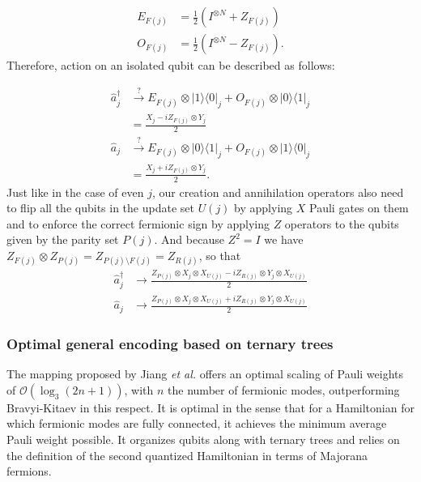 \begin{equation}
\begin{aligned}
E_{F(j)} &= \frac{1}{2}\left(I^{\otimes N} + Z_{F(j)} \right)\\
O_{F(j)} &= \frac{1}{2}\left(I^{\otimes N} - Z_{F(j)} \right).
\end{aligned}
\label{eq:BKprojection}
\end{equation}
Therefore, action on an isolated qubit can be described as follows:

\begin{equation}
\label{eq:BKladder3}
\begin{aligned}
\hat{a}_{j}^{\dagger} &\xrightarrow{?}  E_{F(j)} \otimes |1\rangle \langle 0|_{j}  +  O_{F(j)} \otimes |0\rangle \langle 1|_{j}   \\
&= \frac{X_{j} - i Z_{F(j)} \otimes Y_{j}}{2} \\
\hat{a}_{j} &\xrightarrow{?}  E_{F(j)} \otimes |0\rangle \langle 1|_{j}  + O_{F(j)} \otimes |1\rangle \langle 0|_{j}   \\
&= \frac{X_{j} +   i Z_{F(j)} \otimes Y_{j}}{2}.
\end{aligned}
\end{equation}
Just like in the case of even $j$, our creation and annihilation operators also need to flip all the qubits in the update set $U(j)$ by applying $X$ Pauli gates on them and to enforce the correct fermionic sign by applying $Z$ operators to the qubits given by the parity set $P(j)$. And because $Z^2 = I$ we have $Z_{F(j)} \otimes Z_{P(j)} = Z_{P(j) \setminus F(j)} = Z_{R(j)}$, so that
\begin{equation}
\label{eq:BKladder4}
\begin{aligned}
\hat{a}_{j}^{\dagger} &\rightarrow \frac{Z_{P(j)} \otimes X_{j} \otimes X_{U(j)} -i  Z_{R(j)} \otimes Y_{j} \otimes X_{U(j)} }{2}\\
\hat{a}_{j} &\rightarrow \frac{ Z_{P(j)} \otimes X_{j} \otimes X_{U(j)}+ i Z_{R(j)} \otimes Y_{j} \otimes  X_{U(j)}}{2}
\end{aligned}
\end{equation}


\subsubsection{Optimal general encoding based on ternary trees} \label{sec:ternary_tree_encoding}

The mapping proposed by Jiang \textit{et al.} \cite{Jiang2020} offers an optimal scaling of Pauli weights of $\mathcal{O}(\log_3(2n + 1))$, with $n$ the number of fermionic modes, outperforming Bravyi-Kitaev in this respect. It is optimal in the sense that for a Hamiltonian for which fermionic modes are fully connected, it achieves the minimum average Pauli weight possible. It organizes qubits along with ternary trees \cite{Vlasov2019} and relies on the definition of the second quantized Hamiltonian in terms of Majorana fermions.

